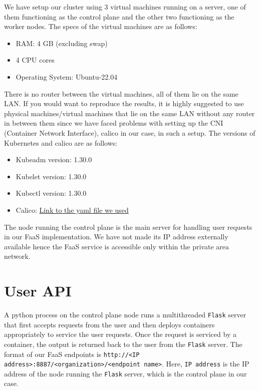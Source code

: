 \documentclass{article}
\begin{document}
We have setup our cluster using 3 virtual machines running on a server, one of them functioning as the control plane and the other two functioning as the worker nodes. The specs of the virtual machines are as follows:
\begin{itemize}
    \item RAM: 4 GB (excluding swap)
    \item 4 CPU cores
    \item Operating System: Ubuntu-22.04 
\end{itemize}
There is no router between the virtual machines, all of them lie on the same LAN. If you would want to reproduce the results, it is highly suggested to use physical machines/virtual machines that lie on the same LAN without any router in between them since we have faced problems with setting up the CNI (Container Network Interface), calico in our case, in such a setup. The versions of Kubernetes and calico are as follows:
\begin{itemize}
    \item Kubeadm version: 1.30.0
    \item Kubelet version: 1.30.0
    \item Kubectl version: 1.30.0
    \item Calico: \href{https://raw.githubusercontent.com/projectcalico/calico/v3.27.3/manifests/calico-typha.yaml}{Link to the yaml file we used}
\end{itemize}
The node running the control plane is the main server for handling user requests in our FaaS implementation. We have not made its IP  address externally available hence the FaaS service is accessible only within the private area network.

\section{User API}
A python process on the control plane node runs a multithreaded \texttt{Flask} server that first accepts requests from the user and then deploys containers appropriately to service the user requests. Once the request is serviced by a container, the output is returned back to the user from the \texttt{Flask} server. The format of our FaaS endpoints is \texttt{http://<IP address>:8887/<organization>/<endpoint name>}. Here, \texttt{IP address} is the IP address of the node running the \texttt{Flask} server, which is the control plane in our case.
\end{document}
